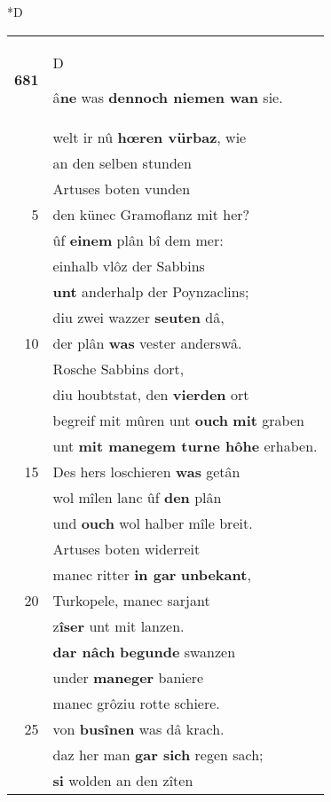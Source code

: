 \documentclass[8pt,a4paper,notitlepage]{article}
\begin{document}
\begin{table}[ht]
\begin{minipage}[t]{0.5\linewidth}
\small
\begin{center}*D
\end{center}
\begin{tabular}{rl}
\textbf{681} & \begin{large}D\end{large}â\textbf{ne} was \textbf{dennoch niemen wan} sie.\\ 
 & welt ir nû \textbf{hœren vürbaz}, wie\\ 
 & an den selben stunden\\ 
 & Artuses boten vunden\\ 
5 & den künec Gramoflanz mit her?\\ 
 & ûf \textbf{einem} plân bî dem mer:\\ 
 & einhalb vlôz der Sabbins\\ 
 & \textbf{unt} anderhalp der Poynzaclins;\\ 
 & diu zwei wazzer \textbf{seuten} dâ,\\ 
10 & der plân \textbf{was} vester anderswâ.\\ 
 & Rosche Sabbins dort,\\ 
 & diu houbtstat, den \textbf{vierden} ort\\ 
 & begreif mit mûren unt \textbf{ouch} \textbf{mit} graben\\ 
 & unt \textbf{mit manegem turne hôhe} erhaben.\\ 
15 & Des hers loschieren \textbf{was} getân\\ 
 & wol mîlen lanc ûf \textbf{den} plân\\ 
 & und \textbf{ouch} wol halber mîle breit.\\ 
 & Artuses boten widerreit\\ 
 & manec ritter \textbf{in gar} \textbf{unbekant},\\ 
20 & Turkopele, manec sarjant\\ 
 & z\textbf{îser} unt mit lanzen.\\ 
 & \textbf{dar nâch} \textbf{begunde} swanzen\\ 
 & under \textbf{maneger} baniere\\ 
 & manec grôziu rotte schiere.\\ 
25 & von \textbf{busînen} was dâ krach.\\ 
 & daz her man \textbf{gar sich} regen sach;\\ 
 & \textbf{si} wolden an den zîten\\ 

\end{tabular}
\end{minipage}
\end{table}
\end{document}
